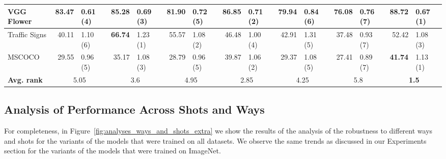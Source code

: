 \documentclass{article} \usepackage{iclr2020_conference,times}
\begin{document}
\begin{sidewaystable*}
{\begin{tabular}{|l *{7}{r@{}l|}}
VGG Flower                  & 83.47       & 0.61 (4)         & 85.28       & 0.69 (3)           & 81.90       & 0.72 (5)              & 86.85       & 0.71 (2)           & 79.94       & 0.84 (6)          & 76.08       & 0.76 (7)               & \bf{88.72}  & 0.67 (1)        \\\hline
Traffic Signs               & 40.11       & 1.10 (6)         & \bf{66.74}  & 1.23 (1)           & 55.57       & 1.08 (2)              & 46.48       & 1.00 (4)           & 42.91       & 1.31 (5)          & 37.48       & 0.93 (7)               & 52.42       & 1.08 (3)        \\\hline
MSCOCO                      & 29.55       & 0.96 (5)         & 35.17       & 1.08 (3)           & 28.79       & 0.96 (5)              & 39.87       & 1.06 (2)           & 29.37       & 1.08 (5)          & 27.41       & 0.89 (7)               & \bf{41.74}  & 1.13 (1)        \\\hline\hline
\textbf{Avg. rank}          & \multicolumn{2}{c|}{5.05}      & \multicolumn{2}{c|}{3.6}         & \multicolumn{2}{c|}{4.95}           & \multicolumn{2}{c|}{2.85}        & \multicolumn{2}{c|}{4.25}       & \multicolumn{2}{c|}{5.8}             & \multicolumn{2}{c|}{\bf{1.5}} \\\hline
\end{tabular}
}
\end{sidewaystable*}
 
\subsection{Analysis of Performance Across Shots and Ways}
\label{sec:appendix_analysis}

For completeness, in Figure~\ref{fig:analyses_ways_and_shots_extra} we show the results of the analysis of the robustness to
different ways and shots for the variants of the models that were trained on
all datasets. We observe the same trends as discussed in our Experiments
section for the variants of the models that were trained on ImageNet.

\begin{figure*}[htp]
  \centering
  \hspace{0.1cm}
	\hspace{0.1cm}
	\caption{\label{fig:analyses_ways_and_shots_extra} Analysis of performance as a function of the episode's way, shots for models whose training source is (the training data of) all datasets. The bands display 95\% confidence intervals.}
\end{figure*}
\end{document}
